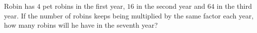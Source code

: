Robin has $4$ pet robins in the first year, $16$ in the second year and $64$ in the third year. If the number of robins keeps being multiplied by the same factor each year, how many robins will he have in the seventh year?
